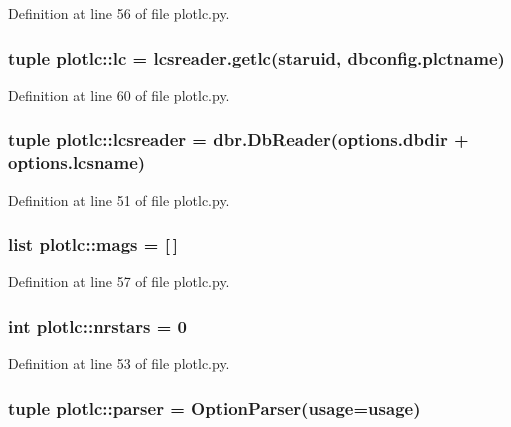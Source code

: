 Definition at line 56 of file plotlc.py.

\hypertarget{namespaceplotlc_abfc0239bb4b4ca08e710d0fc52097ddd}{
\subsubsection[{lc}]{\setlength{\rightskip}{0pt plus 5cm}tuple {\bf plotlc::lc} = lcsreader.getlc({\bf staruid}, dbconfig.plctname)}}
\label{namespaceplotlc_abfc0239bb4b4ca08e710d0fc52097ddd}


Definition at line 60 of file plotlc.py.

\hypertarget{namespaceplotlc_a2a0d074a3711ec9740f0c40e2b5f6739}{
\subsubsection[{lcsreader}]{\setlength{\rightskip}{0pt plus 5cm}tuple {\bf plotlc::lcsreader} = dbr.DbReader(options.dbdir + options.lcsname)}}
\label{namespaceplotlc_a2a0d074a3711ec9740f0c40e2b5f6739}


Definition at line 51 of file plotlc.py.

\hypertarget{namespaceplotlc_abdfb5c2d4ea6f8b8a078e7a8098cf810}{
\subsubsection[{mags}]{\setlength{\rightskip}{0pt plus 5cm}list {\bf plotlc::mags} = \mbox{[}$\,$\mbox{]}}}
\label{namespaceplotlc_abdfb5c2d4ea6f8b8a078e7a8098cf810}


Definition at line 57 of file plotlc.py.

\hypertarget{namespaceplotlc_a84471a136dabdafed339bdf74af64d6c}{
\subsubsection[{nrstars}]{\setlength{\rightskip}{0pt plus 5cm}int {\bf plotlc::nrstars} = 0}}
\label{namespaceplotlc_a84471a136dabdafed339bdf74af64d6c}


Definition at line 53 of file plotlc.py.

\hypertarget{namespaceplotlc_abb846dd0f2e1e6a77c518417f0504a52}{
\subsubsection[{parser}]{\setlength{\rightskip}{0pt plus 5cm}tuple {\bf plotlc::parser} = OptionParser({\bf usage}={\bf usage})}}
\label{namespaceplotlc_abb846dd0f2e1e6a77c518417f0504a52}


